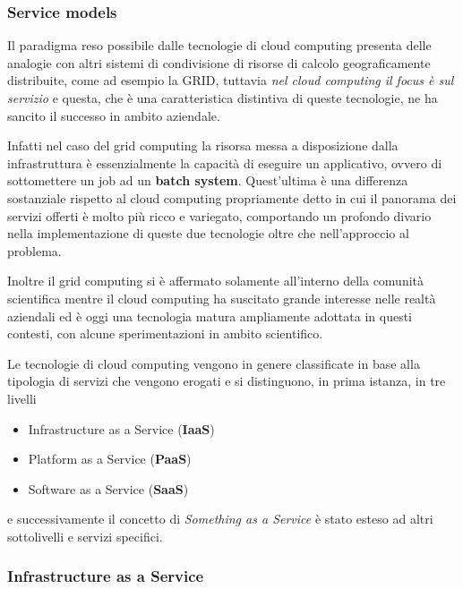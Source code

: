 \documentclass[italian,]{article}
\providecommand{\tightlist}{%
  \setlength{\itemsep}{0pt}\setlength{\parskip}{0pt}}
\begin{document}
\subsubsection{Service models}\label{service-models}

Il paradigma reso possibile dalle tecnologie di cloud computing presenta
delle analogie con altri sistemi di condivisione di risorse di calcolo
geograficamente distribuite, come ad esempio la GRID, tuttavia \emph{nel
cloud computing il focus è sul servizio} e questa, che è una
caratteristica distintiva di queste tecnologie, ne ha sancito il
successo in ambito aziendale.

Infatti nel caso del grid computing la risorsa messa a disposizione
dalla infrastruttura è essenzialmente la capacità di eseguire un
applicativo, ovvero di sottomettere un job ad un \textbf{batch system}.
Quest'ultima è una differenza sostanziale rispetto al cloud computing
propriamente detto in cui il panorama dei servizi offerti è molto più
ricco e variegato, comportando un profondo divario nella implementazione
di queste due tecnologie oltre che nell'approccio al problema.

Inoltre il grid computing si è affermato solamente all'interno della
comunità scientifica mentre il cloud computing ha suscitato grande
interesse nelle realtà aziendali ed è oggi una tecnologia matura
ampliamente adottata in questi contesti, con alcune sperimentazioni in
ambito scientifico.

Le tecnologie di cloud computing vengono in genere classificate in base
alla tipologia di servizi che vengono erogati e si distinguono, in prima
istanza, in tre livelli

\begin{itemize}
\tightlist
\item
  Infrastructure as a Service (\textbf{IaaS})
\item
  Platform as a Service (\textbf{PaaS})
\item
  Software as a Service (\textbf{SaaS})
\end{itemize}

e successivamente il concetto di \emph{Something as a Service} è stato
esteso ad altri sottolivelli e servizi specifici.

\subsubsection{Infrastructure as a
Service}\label{infrastructure-as-a-service}
\end{document}

